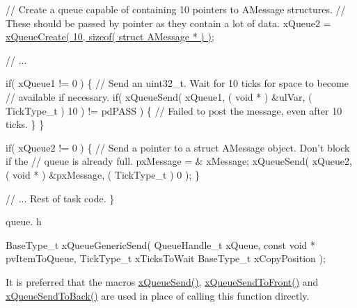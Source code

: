 \begin{DoxyPre} // Create a queue capable of containing 10 pointers to AMessage structures.
 // These should be passed by pointer as they contain a lot of data.
 xQueue2 = \hyperlink{vendor_2ceedling_2plugins_2freertos_2src_2freertos_2include_2queue_8h_aeb858b824bd74a934ea7ebb81af2a6bb}{xQueueCreate( 10, sizeof( struct AMessage * ) )};\end{DoxyPre}



\begin{DoxyPre} // ...\end{DoxyPre}



\begin{DoxyPre} if( xQueue1 != 0 )
 \{
     // Send an uint32\_t.  Wait for 10 ticks for space to become
     // available if necessary.
     if( xQueueSend( xQueue1, ( void * ) \&ulVar, ( TickType\_t ) 10 ) != pdPASS )
     \{
         // Failed to post the message, even after 10 ticks.
     \}
 \}\end{DoxyPre}



\begin{DoxyPre} if( xQueue2 != 0 )
 \{
     // Send a pointer to a struct AMessage object.  Don't block if the
     // queue is already full.
     pxMessage = \& xMessage;
     xQueueSend( xQueue2, ( void * ) \&pxMessage, ( TickType\_t ) 0 );
 \}\end{DoxyPre}



\begin{DoxyPre} // ... Rest of task code.
\}
\end{DoxyPre}


queue. h 
\begin{DoxyPre}
BaseType\_t xQueueGenericSend(
                                 QueueHandle\_t xQueue,
                                 const void * pvItemToQueue,
                                 TickType\_t xTicksToWait
                                 BaseType\_t xCopyPosition
                             );
\end{DoxyPre}


It is preferred that the macros \hyperlink{vendor_2ceedling_2plugins_2freertos_2src_2freertos_2include_2queue_8h_af7eb49d3249351176992950d9185abe9}{x\+Queue\+Send()}, \hyperlink{vendor_2ceedling_2plugins_2freertos_2src_2freertos_2include_2queue_8h_aa612fcc2b1ceee0200f34b942e300b41}{x\+Queue\+Send\+To\+Front()} and \hyperlink{vendor_2ceedling_2plugins_2freertos_2src_2freertos_2include_2queue_8h_a81d24a2c1199d58efb76fbee15853112}{x\+Queue\+Send\+To\+Back()} are used in place of calling this function directly.

